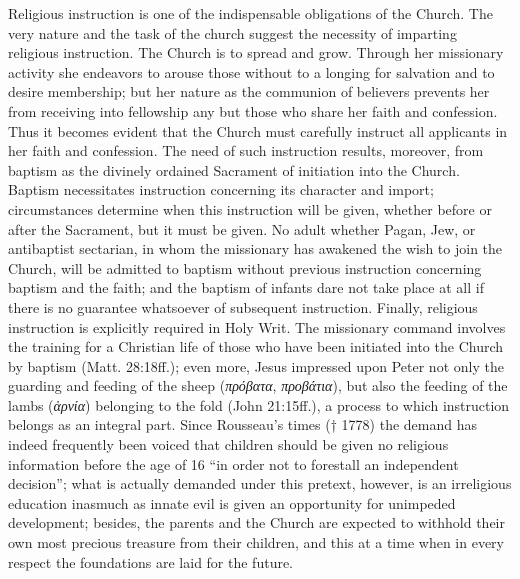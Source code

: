 Religious instruction is one of the indispensable obligations of the Church. The very nature and the task of the church suggest the necessity of imparting religious instruction. The Church is to spread and grow. Through her missionary activity she endeavors to arouse those without to a longing for salvation and to desire membership; but her nature as the communion of believers prevents her from receiving into fellowship any but those who share her faith and confession. Thus it becomes evident that the Church must carefully instruct all applicants in her faith and confession. The need of such instruction results, moreover, from baptism as the divinely ordained Sacrament of initiation into the Church. Baptism necessitates instruction concerning its character and import; circumstances determine when this instruction will be given, whether before or after the Sacrament, but it must be given. No adult whether Pagan, Jew, or antibaptist sectarian, in whom the missionary has awakened the wish to join the Church, will be admitted to baptism without previous instruction concerning baptism and the faith; and the baptism of infants dare not take place at all if there is no guarantee whatsoever of subsequent instruction. Finally, religious instruction is explicitly required in Holy Writ. The missionary command involves the training
for a Christian life of those who have been initiated into the Church by baptism (Matt. 28:18ff.); even more, Jesus impressed upon Peter not only the guarding and feeding of the sheep (\emph{πρόβατα}, \emph{προβάτια}), but also the feeding of the lambs (\emph{ἀρνία}) belonging to the fold (John 21:15ff.), a process to which instruction belongs as an integral part. Since Rousseau’s times († 1778) the demand has indeed frequently been voiced that children should be given no religious information before the age of 16 “in order not to forestall an independent decision”; what is actually demanded under this pretext, however, is an irreligious education inasmuch as innate evil is given an opportunity for unimpeded development; besides, the parents and the Church are expected to withhold their own most precious treasure from their children, and this at a time when in every respect the foundations are laid for the future.

